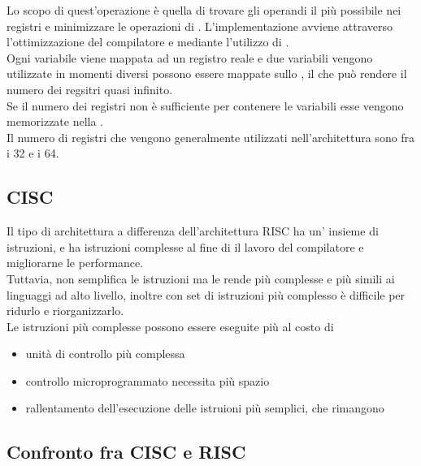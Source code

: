 \documentclass[arch.tex]{subfiles}
\begin{document}
%
\label{par:otimizzazione_dei_registri}

Lo scopo di quest'operazione è quella di trovare gli operandi il più possibile nei registri
e minimizzare le operazioni di . L'implementazione  avviene
attraverso l'ottimizzazione del compilatore e mediante l'utilizzo di .\\
Ogni variabile viene mappata ad un registro reale e  due variabili vengono utilizzate
in momenti diversi possono essere mappate sullo , il che può rendere il
numero dei regsitri quasi infinito.\\ 
Se il numero dei registri non è sufficiente per contenere  le variabili esse
vengono memorizzate nella .\\
Il numero di registri che vengono generalmente utilizzati nell'architettura  sono
fra i 32 e i 64.

\subsection{CISC}%
\label{sub:cisc}
Il tipo di architettura   a differenza 
dell'architettura RISC ha un' insieme di istruzioni, e ha istruzioni 
 complesse al fine di  il lavoro del compilatore e migliorarne le
performance.\\
Tuttavia, non semplifica le istruzioni ma le rende più complesse e più simili ai linguaggi ad
alto livello, inoltre con set di istruzioni più complesso è difficile  per ridurlo e riorganizzarlo.\\
Le istruzioni più complesse possono essere eseguite più   al costo di

\begin{itemize}
	\item unità di controllo più complessa
	\item controllo microprogrammato necessita più spazio
	\item rallentamento dell'esecuzione delle istruioni più semplici, che rimangono
\end{itemize}

\subsection{Confronto fra CISC e RISC}%
\label{sub:confronto_fra_cisc_e_risc}
\end{document}
